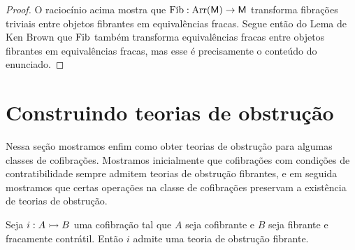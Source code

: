 \begin{proof}
  O raciocínio acima mostra que $\mathrm{Fib}: \mathrm{Arr}(\mathsf{M}) \to \mathsf{M}$ transforma fibrações triviais entre objetos fibrantes em equivalências fracas.
  Segue então do Lema de Ken Brown que $\mathrm{Fib}$ também transforma equivalências fracas entre objetos fibrantes em equivalências fracas, mas esse é precisamente o conteúdo do enunciado.
\end{proof}

\section{Construindo teorias de obstrução}

Nessa seção mostramos enfim como obter teorias de obstrução para algumas classes de cofibrações.
Mostramos inicialmente que cofibrações com condições de contratibilidade sempre admitem teorias de obstrução fibrantes, e em seguida mostramos que certas operações na classe de cofibrações preservam a existência de teorias de obstrução.

\begin{teo}
  Seja $i: A \rightarrowtail B$ uma cofibração tal que $A$ seja cofibrante e $B$ seja fibrante e fracamente contrátil.
  Então $i$ admite uma teoria de obstrução fibrante.
\end{teo}

